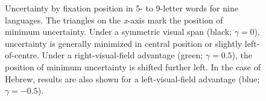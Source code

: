 \documentclass[doc,biblatex]{apa7}
\begin{document}
\begin{figure}
\vspace*{2pt}
\caption{Uncertainty by fixation position in 5- to 9-letter words for nine languages. The triangles on the \textit{x}-axis mark the position of minimum uncertainty. Under a symmetric visual span (black; $\gamma=0$), uncertainty is generally minimized in central position or slightly left-of-centre. Under a right-visual-field advantage (green; $\gamma=0.5$), the position of minimum uncertainty is shifted further left. In the case of Hebrew, results are also shown for a left-visual-field advantage (blue; $\gamma=-0.5$).}
\label{supp1}
\end{figure}

\clearpage
\end{document}

